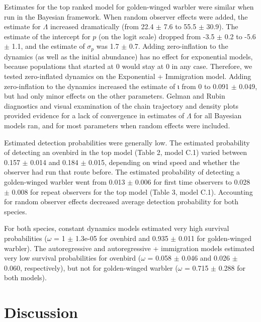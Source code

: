 \documentclass[12pt]{article}
\begin{document}
Estimates for the top ranked model for golden-winged warbler
were similar when run in the Bayesian framework. When random
observer effects were added, the estimate for $\Lambda$ increased dramatically
(from 22.4 $\pm$ 7.6 to 55.5 $\pm$ 30.9). The estimate of the intercept
for $p$ (on the logit scale) dropped from -3.5 $\pm$ 0.2 to -5.6 $\pm$ 1.1, and the
estimate of $\sigma_p$ was 1.7 $\pm$ 0.7. Adding zero-inflation to the dynamics (as well as
the initial abundance) has no effect for exponential models, because populations
that started at 0 would stay at 0 in any case. Therefore, we tested
zero-inflated dynamics on the Exponential + Immigration model. Adding zero-inflation to the dynamics
increased the estimate of ι from 0 to 0.091 $\pm$ 0.049, but had only minor
effects on the other parameters. Gelman and Rubin diagnostics and visual
examination of the chain trajectory and density plots provided evidence for a lack of convergence in
estimates of $\Lambda$ for all Bayesian models ran, and for most parameters when random
effects were included.

Estimated detection probabilities were generally low. The estimated probability
of detecting an ovenbird in the top model (Table 2, model C.1) varied between 0.157
$\pm$ 0.014 and 0.184 $\pm$ 0.015, depending on wind speed and whether the
observer had run that route before. The estimated probability of detecting a
golden-winged warbler went from 0.013 $\pm$ 0.006 for first time observers to 0.028 $\pm$ 0.008 for
repeat observers for the top model (Table 3, model C.1). Accounting for random
observer effects decreased average detection probability for both species.

For both species, constant dynamics models estimated very high
survival probabilities ($\omega$ = 1 $\pm$ 1.3e-05 for ovenbird and
0.935 $\pm$ 0.011 for
golden-winged warbler). The autoregressive and autoregressive + immigration
models estimated very low survival probabilities for ovenbird ($\omega$ =
0.058 $\pm$ 0.046 and 0.026 $\pm$ 0.060, respectively), 
but not for golden-winged warbler ($\omega$ = 0.715 $\pm$ 0.288 for both models).




\section{Discussion}

\end{document}
